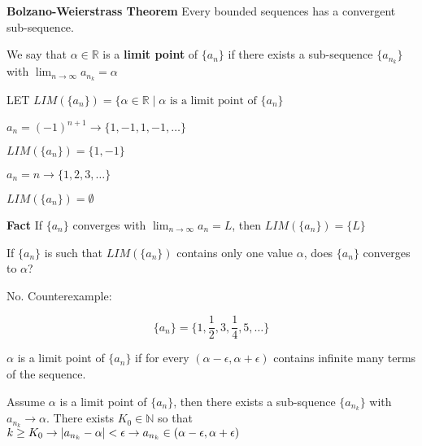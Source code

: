 
\begin{thm} \textbf{Bolzano-Weierstrass Theorem}
Every bounded sequences has a convergent sub-sequence.
\end{thm}

\begin{defn}
We say that $\alpha \in \mathbb{R}$ is a \textbf{limit point} of $\{a_n\}$ if there exists a sub-sequence $\{a_{n_k}\}$ with $\lim_{n\to\infty}a_{n_k} = \alpha$
\end{defn}

LET $LIM(\{a_n\}) = \{\alpha\in\mathbb{R} \mid \alpha \text{ is a limit point of } \{a_n\}$

\begin{exmp}
$a_n = (-1)^{n+1} \to \{1,-1,1,-1,\dots\}$

$LIM(\{a_n\}) = \{1,-1\}$
\end{exmp}

\begin{exmp}
$a_n = n \to \{1,2,3,\dots\}$

$LIM(\{a_n\}) = \emptyset$
\end{exmp}

\textbf{Fact} If $\{a_n\}$ converges with $\lim_{n\to\infty} a_n = L$, then $LIM(\{a_n\}) = \{L\}$

\begin{ques}
If $\{a_n\}$ is such that $LIM(\{a_n\})$ contains only one value $\alpha$, does $\{a_n\}$ converges to $\alpha$?
\end{ques}

No. Counterexample:

\[
\{a_n\} = \{1,\frac{1}{2},3,\frac{1}{4},5,\dots\}
\]


\begin{prop}
$\alpha$ is a limit point of $\{a_n\}$ if for every $(\alpha - \epsilon, \alpha + \epsilon )$ contains infinite many terms of the sequence.
\end{prop}

Assume $\alpha$ is a limit point of $\{a_n\}$, then there exists a sub-squence $\{a_{n_k}\}$ with $a_{n_k} \to \alpha$. There exists $K_0 \in \mathbb{N}$ so that $k\geq K_0 \to \left| a_{n_k} - \alpha \right| < \epsilon \to a_{n_k}\in (\alpha - \epsilon, \alpha + \epsilon )$

